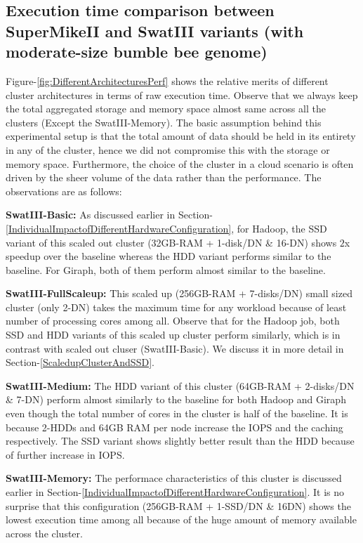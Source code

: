 \documentclass[conference]{IEEEtran}
\begin{document}
\subsection {Execution time comparison between SuperMikeII and SwatIII variants (with moderate-size bumble bee genome)} \label{ExecutionTimeDiffArchBumblebee}
Figure-\ref{fig:DifferentArchitecturesPerf} shows the relative merits of different cluster architectures in terms of raw execution time.
Observe that we always keep the total aggregated storage and memory space almost same across all the clusters (Except the SwatIII-Memory).
The basic assumption behind this experimental setup is that the total amount of data should be held in its entirety in any of the cluster, hence we did not compromise this with the storage or memory space. 
Furthermore, the choice of the cluster in a cloud scenario is often driven by the sheer volume of the data rather than the performance.
The observations are as follows:
\begin{inparaenum}[\itshape 1\upshape)]
\item \textbf{SwatIII-Basic:} As discussed earlier in Section-\ref{IndividualImpactofDifferentHardwareConfiguration}, for Hadoop, the SSD variant of this scaled out cluster (32GB-RAM + 1-disk/DN \& 16-DN) shows $2$x speedup over the baseline whereas the HDD variant performs similar to the baseline. For Giraph, both of them perform almost similar to the baseline.
\item \textbf{SwatIII-FullScaleup:} This scaled up (256GB-RAM + 7-disks/DN) small sized cluster (only 2-DN) takes the maximum time for any workload because of least number of processing cores among all. Observe that for the Hadoop job, both SSD and HDD variants of this scaled up cluster perform similarly, which is in contrast with scaled out cluser (SwatIII-Basic). We discuss it in more detail in Section-\ref{ScaledupClusterAndSSD}.
\item \textbf{SwatIII-Medium:} The HDD variant of this cluster (64GB-RAM + 2-disks/DN \& 7-DN) perform almost similarly to the baseline for both Hadoop and Giraph even though the total number of cores in the cluster is half of the baseline. It is because 2-HDDs and 64GB RAM per node increase the IOPS and the caching respectively. The SSD variant shows slightly better result than the HDD because of further increase in IOPS.
\item \textbf{SwatIII-Memory:} The performace characteristics of this cluster is discussed earlier in Section-\ref{IndividualImpactofDifferentHardwareConfiguration}. 
It is no surprise that this configuration (256GB-RAM + 1-SSD/DN \& 16DN) shows the lowest execution time among all because of the huge amount of memory available across the cluster.
\end{inparaenum}
\end{document}
